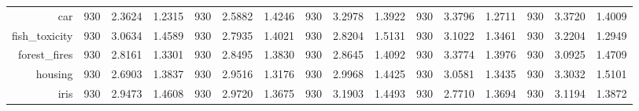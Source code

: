 \begin{table}[htbp]
{\begin{tabular}{rccccccccccccccc}
			car                                 & 930                                   & \cellcolor[rgb]{ .776,  .937,  .808}\textcolor[rgb]{ 0,  .38,  0}{2.3624}          & 1.2315          & 930            & 2.5882                                                                    & 1.4246          & 930            & 3.2978                                                                    & 1.3922          & 930            & 3.3796                                                                    & 1.2711          & 930            & 3.3720          & 1.4009          \\
			fish\_toxicity                      & 930                                   & 3.0634                                                                             & 1.4589          & 930            & \cellcolor[rgb]{ .776,  .937,  .808}\textcolor[rgb]{ 0,  .38,  0}{2.7935} & 1.4021          & 930            & 2.8204                                                                    & 1.5131          & 930            & 3.1022                                                                    & 1.3461          & 930            & 3.2204          & 1.2949          \\
			forest\_fires                       & 930                                   & \cellcolor[rgb]{ .776,  .937,  .808}\textcolor[rgb]{ 0,  .38,  0}{2.8161}          & 1.3301          & 930            & 2.8495                                                                    & 1.3830          & 930            & 2.8645                                                                    & 1.4092          & 930            & 3.3774                                                                    & 1.3976          & 930            & 3.0925          & 1.4709          \\
			housing                             & 930                                   & \cellcolor[rgb]{ .776,  .937,  .808}\textcolor[rgb]{ 0,  .38,  0}{2.6903}          & 1.3837          & 930            & 2.9516                                                                    & 1.3176          & 930            & 2.9968                                                                    & 1.4425          & 930            & 3.0581                                                                    & 1.3435          & 930            & 3.3032          & 1.5101          \\
			iris                                & 930                                   & 2.9473                                                                             & 1.4608          & 930            & 2.9720                                                                    & 1.3675          & 930            & 3.1903                                                                    & 1.4493          & 930            & \cellcolor[rgb]{ .776,  .937,  .808}\textcolor[rgb]{ 0,  .38,  0}{2.7710} & 1.3694          & 930            & 3.1194          & 1.3872          \\

\end{tabular}}
\end{table}
